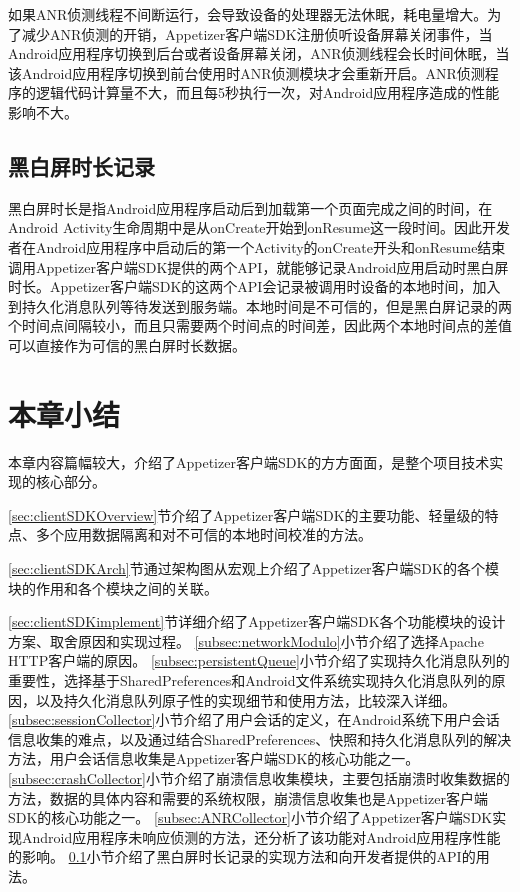 如果ANR侦测线程不间断运行，会导致设备的处理器无法休眠，耗电量增大。为了减少ANR侦测的开销，Appetizer客户端SDK注册侦听设备屏幕关闭事件，当Android应用程序切换到后台或者设备屏幕关闭，ANR侦测线程会长时间休眠，当该Android应用程序切换到前台使用时ANR侦测模块才会重新开启。ANR侦测程序的逻辑代码计算量不大，而且每5秒执行一次，对Android应用程序造成的性能影响不大。

\subsection{黑白屏时长记录}
\label{subsec:blackWhiteCollector}

黑白屏时长是指Android应用程序启动后到加载第一个页面完成之间的时间，在Android Activity生命周期中是从onCreate开始到onResume这一段时间。因此开发者在Android应用程序中启动后的第一个Activity的onCreate开头和onResume结束调用Appetizer客户端SDK提供的两个API，就能够记录Android应用启动时黑白屏时长。Appetizer客户端SDK的这两个API会记录被调用时设备的本地时间，加入到持久化消息队列等待发送到服务端。本地时间是不可信的，但是黑白屏记录的两个时间点间隔较小，而且只需要两个时间点的时间差，因此两个本地时间点的差值可以直接作为可信的黑白屏时长数据。

\section{本章小结}

本章内容篇幅较大，介绍了Appetizer客户端SDK的方方面面，是整个项目技术实现的核心部分。

\ref{sec:clientSDKOverview}节介绍了Appetizer客户端SDK的主要功能、轻量级的特点、多个应用数据隔离和对不可信的本地时间校准的方法。

\ref{sec:clientSDKArch}节通过架构图从宏观上介绍了Appetizer客户端SDK的各个模块的作用和各个模块之间的关联。

\ref{sec:clientSDKimplement}节详细介绍了Appetizer客户端SDK各个功能模块的设计方案、取舍原因和实现过程。
\ref{subsec:networkModulo}小节介绍了选择Apache HTTP客户端的原因。
\ref{subsec:persistentQueue}小节介绍了实现持久化消息队列的重要性，选择基于SharedPreferences和Android文件系统实现持久化消息队列的原因，以及持久化消息队列原子性的实现细节和使用方法，比较深入详细。
\ref{subsec:sessionCollector}小节介绍了用户会话的定义，在Android系统下用户会话信息收集的难点，以及通过结合SharedPreferences、快照和持久化消息队列的解决方法，用户会话信息收集是Appetizer客户端SDK的核心功能之一。
\ref{subsec:crashCollector}小节介绍了崩溃信息收集模块，主要包括崩溃时收集数据的方法，数据的具体内容和需要的系统权限，崩溃信息收集也是Appetizer客户端SDK的核心功能之一。
\ref{subsec:ANRCollector}小节介绍了Appetizer客户端SDK实现Android应用程序未响应侦测的方法，还分析了该功能对Android应用程序性能的影响。
\ref{subsec:blackWhiteCollector}小节介绍了黑白屏时长记录的实现方法和向开发者提供的API的用法。
